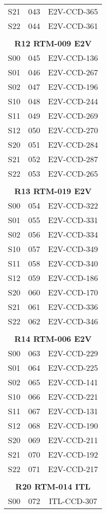 \begin{longtable}{ccc}
  S21 & 043 & E2V-CCD-365 \\
  S22 & 044 & E2V-CCD-361 \\
 & & \\
\multicolumn{3}{c}{\bf R12  RTM-009  E2V} \\
\hline
  S00 & 045 & E2V-CCD-136 \\
  S01 & 046 & E2V-CCD-267 \\
  S02 & 047 & E2V-CCD-196 \\
  S10 & 048 & E2V-CCD-244 \\
  S11 & 049 & E2V-CCD-269 \\
  S12 & 050 & E2V-CCD-270 \\
  S20 & 051 & E2V-CCD-284 \\
  S21 & 052 & E2V-CCD-287 \\
  S22 & 053 & E2V-CCD-265 \\
 & & \\
\multicolumn{3}{c}{\bf R13  RTM-019  E2V} \\
\hline
  S00 & 054 & E2V-CCD-322 \\
  S01 & 055 & E2V-CCD-331 \\
  S02 & 056 & E2V-CCD-334 \\
  S10 & 057 & E2V-CCD-349 \\
  S11 & 058 & E2V-CCD-340 \\
  S12 & 059 & E2V-CCD-186 \\
  S20 & 060 & E2V-CCD-170 \\
  S21 & 061 & E2V-CCD-336 \\
  S22 & 062 & E2V-CCD-346 \\
 & & \\
\multicolumn{3}{c}{\bf R14  RTM-006  E2V} \\
\hline
  S00 & 063 & E2V-CCD-229 \\
  S01 & 064 & E2V-CCD-225 \\
  S02 & 065 & E2V-CCD-141 \\
  S10 & 066 & E2V-CCD-221 \\
  S11 & 067 & E2V-CCD-131 \\
  S12 & 068 & E2V-CCD-190 \\
  S20 & 069 & E2V-CCD-211 \\
  S21 & 070 & E2V-CCD-192 \\
  S22 & 071 & E2V-CCD-217 \\
 & & \\
\multicolumn{3}{c}{\bf R20  RTM-014  ITL} \\
\hline
  S00 & 072 & ITL-CCD-307 \\

\end{longtable}

